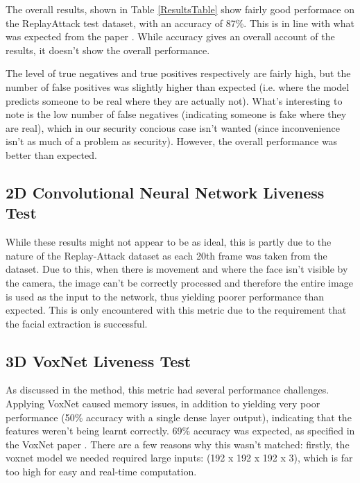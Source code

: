 \documentclass[10pt,a4paper]{article}
\begin{document}
        The overall results, shown in Table \ref{ResultsTable} show fairly good performace on the ReplayAttack test dataset, with an accuracy of 87\%. This is in line with
        what was expected from the paper \cite{ImageQualityAssessmentTest}. While accuracy gives an overall account of the results, it doesn't show the overall performance.
        
        The level of true negatives and true positives respectively are fairly high, but the number of false positives was slightly higher than expected (i.e. where the model predicts someone to be real where they are actually not).
        What's interesting to note is the low number of false negatives (indicating someone is fake where they are real), which in our security concious case isn't wanted (since inconvenience isn't as much of a problem as security).
        However, the overall performance was better than expected.

    \subsection{2D Convolutional Neural Network Liveness Test}

        While these results might not appear to be as ideal, this is partly due to the nature of the Replay-Attack dataset as each 20th frame was taken from the dataset.
        Due to this, when there is movement and where the face isn't visible by the camera, the image can't be correctly processed and therefore the entire image is used
        as the input to the network, thus yielding poorer performance than expected. This is only encountered with this metric due to the requirement that the facial extraction is successful. 
        
    \subsection{3D VoxNet Liveness Test}
            As discussed in the method, this metric had several performance challenges. Applying VoxNet caused memory issues, in addition to yielding very poor performance
            (50\% accuracy with a single dense layer output), indicating that the features weren't being learnt correctly. 69\% accuracy was expected, as specified in the
            VoxNet paper \cite{VoxNetModel}. There are a few reasons why this wasn't matched: firstly, the voxnet model we needed required large inputs: (192 x 192 x 192 x 3),
            which is far too high for easy and real-time computation. 
\end{document}

